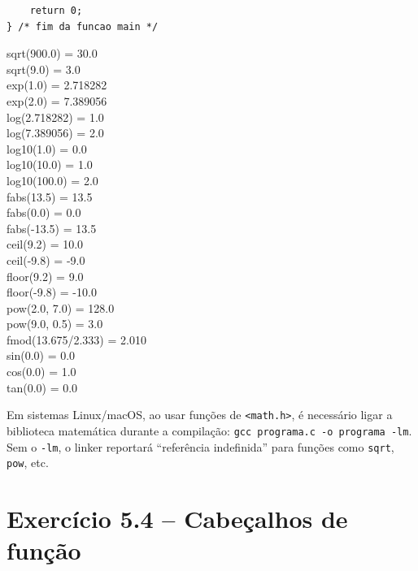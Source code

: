 \documentclass[12pt,a4paper]{article}
\begin{document}
\begin{respostabox}
\begin{lstlisting}
    return 0;
} /* fim da funcao main */
\end{lstlisting}

\begin{saida}
sqrt(900.0) = 30.0\\
sqrt(9.0) = 3.0\\
exp(1.0) = 2.718282\\
exp(2.0) = 7.389056\\
log(2.718282) = 1.0\\
log(7.389056) = 2.0\\
log10(1.0) = 0.0\\
log10(10.0) = 1.0\\
log10(100.0) = 2.0\\
fabs(13.5) = 13.5\\
fabs(0.0) = 0.0\\
fabs(-13.5) = 13.5\\
ceil(9.2) = 10.0\\
ceil(-9.8) = -9.0\\
floor(9.2) = 9.0\\
floor(-9.8) = -10.0\\
pow(2.0, 7.0) = 128.0\\
pow(9.0, 0.5) = 3.0\\
fmod(13.675/2.333) = 2.010\\
sin(0.0) = 0.0\\
cos(0.0) = 1.0\\
tan(0.0) = 0.0
\end{saida}

\begin{boaprática}
  Em sistemas Linux/macOS, ao usar funções de \texttt{<math.h>}, é necessário
  ligar a biblioteca matemática durante a compilação:
  \texttt{gcc programa.c -o programa -lm}. Sem o \texttt{-lm}, o linker reportará
  ``referência indefinida'' para funções como \texttt{sqrt}, \texttt{pow}, etc.
\end{boaprática}
\end{respostabox}

\newpage

\section{Exercício 5.4 -- Cabeçalhos de função}
\end{document}
